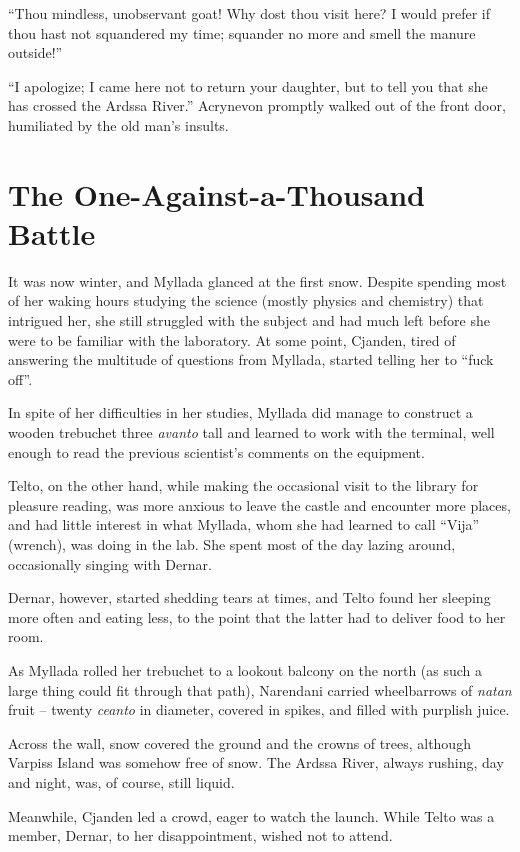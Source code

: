 ``Thou mindless, unobservant goat! Why dost thou visit here? I would prefer if thou hast not squandered my time; squander no more and smell the manure outside!''

``I apologize; I came here not to return your daughter, but to tell you that she has crossed the Ardssa River.'' Acrynevon promptly walked out of the front door, humiliated by the old man's insults.

\chapter{The One-Against-a-Thousand Battle}

It was now winter, and Myllada glanced at the first snow. Despite spending most of her waking hours studying the science (mostly physics and chemistry) that intrigued her, she still struggled with the subject and had much left before she were to be familiar with the laboratory. At some point, Cjanden, tired of answering the multitude of questions from Myllada, started telling her to ``fuck off''.

In spite of her difficulties in her studies, Myllada did manage to construct a wooden trebuchet three \emph{avanto} tall and learned to work with the terminal, well enough to read the previous scientist's comments on the equipment.

Telto, on the other hand, while making the occasional visit to the library for pleasure reading, was more anxious to leave the castle and encounter more places, and had little interest in what Myllada, whom she had learned to call ``Vija'' (wrench), was doing in the lab. She spent most of the day lazing around, occasionally singing with Dernar.

Dernar, however, started shedding tears at times, and Telto found her sleeping more often and eating less, to the point that the latter had to deliver food to her room.

\centeredstars

As Myllada rolled her trebuchet to a lookout balcony on the north (as such a large thing could fit through that path), Narendani carried wheelbarrows of \emph{natan} fruit -- twenty \emph{ceanto} in diameter, covered in spikes, and filled with purplish juice.

Across the wall, snow covered the ground and the crowns of trees, although Varpiss Island was somehow free of snow. The Ardssa River, always rushing, day and night, was, of course, still liquid.

Meanwhile, Cjanden led a crowd, eager to watch the launch. While Telto was a member, Dernar, to her disappointment, wished not to attend.

